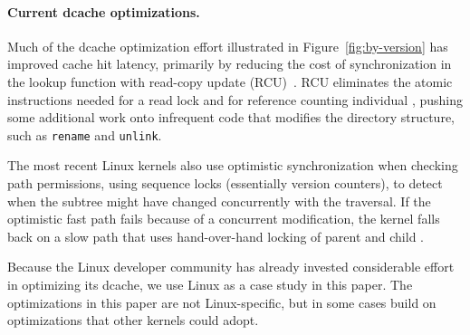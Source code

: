 \paragraph{Current dcache optimizations.}
Much of the dcache optimization effort illustrated in Figure~\ref{fig:by-version}
has improved cache hit latency, primarily by reducing the cost of
synchronization in the lookup function with read-copy update (RCU)~\citep{mckenney04rcu,dcachercu04}.
RCU eliminates the atomic instructions needed for a read lock and for reference counting individual \dentries{},
pushing some additional work onto infrequent code that modifies the directory structure,
such as {\tt rename} and {\tt unlink}.

The most recent Linux kernels also use optimistic synchronization when checking
path permissions, using sequence locks (essentially version counters), 
to detect when the subtree might have changed concurrently with the traversal.
If the optimistic fast path fails because of a concurrent modification, 
the kernel falls back on a slow path that uses
hand-over-hand locking of parent and child \dentries{}.

\begin{comment}
In this paper, we leverage the infrastructure afforded by these optimizations
to cache the results of particularly expensive portions of the infrastructure (\S\ref{sec:dcache}).
The current Linux design also misses several opportunities to leverage negative \dentries{} (\S\ref{sec:readdir}).
\end{comment}
Because the Linux developer community has already invested considerable effort 
in optimizing its dcache, we use Linux as a case study in this paper.
The optimizations in this paper are not Linux-specific,
but in some cases build on optimizations that other kernels could adopt. 




